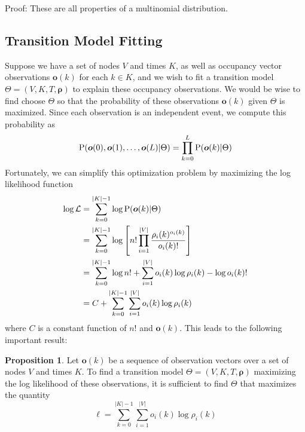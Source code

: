 \documentclass[11pt,letterpaper]{article}
\theoremstyle{definition}
\newtheorem{proposition}{Proposition}[section]
\begin{document}
		Proof: These are all properties of a multinomial distribution.
	
	\subsection{Transition Model Fitting}
	
	Suppose we have a set of nodes $V$ and times $K$, as well as occupancy vector observations $\bm o(k)$ for each $k \in K$, and we wish to fit a transition model $\Theta = (V, K, T, \bm \rho)$ to explain these occupancy observations. We would be wise to find choose $\Theta$ so that the probability of these observations $\bm o(k)$ given $\Theta$ is maximized. Since each observation is an independent event, we compute this probability as 
	\[
		\text P(\bm o(0), \bm o(1), \dots, \bm o(L) | \Theta) = \prod^L_{k = 0} \text P(\bm o(k)|\Theta)
	\]
	Fortunately, we can simplify this optimization problem by maximizing the log likelihood function
	\begin{align*}
		\log \mathcal L &= \sum^{|K| - 1}_{k = 0} \log \text P(\bm o(k)|\Theta) \\
		&= \sum^{|K| - 1}_{k = 0} \log \left[ n! \prod^{|V|}_{i = 1} \frac{\rho_i(k)^{o_i(k)}}{o_i(k)!} \right] \\
		&= \sum^{|K| - 1}_{k = 0} \log n! + \sum^{|V|}_{i = 1} o_i(k) \log \rho_i(k) - \log{o_i(k)!} \\
		&= C + \sum^{|K| - 1}_{k = 0} \sum^{|V|}_{i = 1} o_i(k) \log \rho_i(k)
	\end{align*}
	where $C$ is a constant function of $n!$ and $\bm o(k)$. This leads to the following important result: 
	
	\begin{proposition}
		Let $\bm o(k)$ be a sequence of observation vectors over a set of nodes $V$ and times $K$. To find a transition model $\Theta = (V, K, T, \bm \rho)$ maximizing the log likelihood of these observations, it is sufficient to find $\Theta$ that maximizes the quantity
		\[
			\ell = \sum^{|K| - 1}_{k = 0} \sum^{|V|}_{i=1} o_i(k) \log \rho_i(k)
		\]
	\end{proposition}
	
\end{document}
